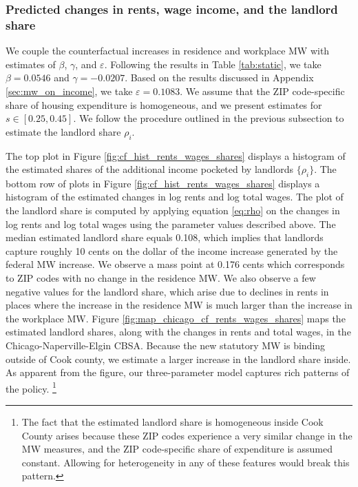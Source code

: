 \subsubsection*{Predicted changes in rents, wage income, and the landlord share}
\label{sec:cf_rents_and_wage_changes}

We couple the counterfactual increases in residence and workplace MW with 
estimates of $\beta$, $\gamma$, and $\varepsilon$.
Following the results in Table \ref{tab:static}, we take $\beta = 0.0546$ and 
$\gamma=-0.0207$.
Based on the results discussed in Appendix \ref{sec:mw_on_income}, we take
$\varepsilon = 0.1083$.
We assume that the ZIP code-specific share of housing expenditure is homogeneous,
and we present estimates for $s\in\left[0.25,0.45\right]$.
We follow the procedure outlined in the previous subsection to estimate the 
landlord share $\rho_i$.

The top plot in Figure \ref{fig:cf_hist_rents_wages_shares} displays a histogram 
of the estimated shares of the additional income pocketed by landlords 
$\{\rho_i\}$.
The bottom row of plots in Figure \ref{fig:cf_hist_rents_wages_shares} displays 
a histogram of the estimated changes in log rents and log total wages.
The plot of the landlord share is computed by applying equation \eqref{eq:rho} 
on the changes in log rents and log total wages using the parameter values
described above.
The median estimated landlord share equals 0.108, which implies that landlords
capture roughly 10 cents on the dollar of the income increase generated by the 
federal MW increase.
We observe a mass point at 0.176 cents which corresponds to ZIP codes with
no change in the residence MW.
We also observe a few negative values for the landlord share, which
arise due to declines in rents in places where the increase in the residence MW
is much larger than the increase in the workplace MW.
Figure \ref{fig:map_chicago_cf_rents_wages_shares} maps the estimated 
landlord shares, along with the changes in rents and total wages, in the 
Chicago-Naperville-Elgin CBSA.
Because the new statutory MW is binding outside of Cook county, 
we estimate a larger increase in the landlord share inside.
As apparent from the figure, our three-parameter model captures rich patterns
of the policy.%
\footnote{The fact that the estimated landlord share is homogeneous inside Cook 
County arises because these ZIP codes experience a very similar change in the MW 
measures, and the ZIP code-specific share of expenditure is assumed constant.
Allowing for heterogeneity in any of these features would break this pattern.}

